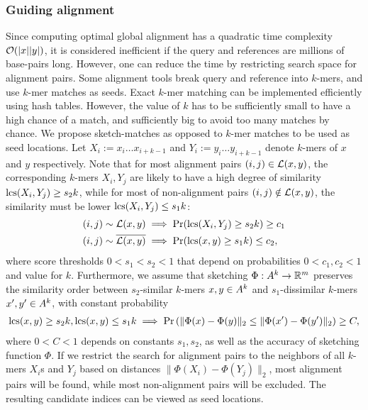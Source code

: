 \subsubsection*{Guiding alignment}
Since computing optimal global alignment has a quadratic time complexity $\mathcal{O}(|x||y|)$, it is considered inefficient if the query and references are millions of base-pairs long. However, one can reduce the time by restricting search space for alignment pairs. Some alignment tools break query and reference into $k$-mers, and use $k$-mer matches as seeds. Exact $k$-mer matching can be implemented efficiently using hash tables. However, the value of $k$ has to be sufficiently small to have a high chance of a match, and sufficiently big to avoid too many matches by chance. 
We propose sketch-matches as opposed to $k$-mer matches to be used as seed locations. Let $X_i:=x_i\dots x_{i+k-1}$ and $Y_i:=y_i\dots y_{i+k-1}$ denote $k$-mers of $x$ and $y$ respectively. Note that for most alignment pairs $(i,j)\in \mathcal{L}(x,y)$, the corresponding $k$-mers $X_i,Y_j$ are likely to have a high degree of similarity $\operatorname{\mathrm{lcs}}(X_i,Y_j)\ge s_2 k$, while for most of non-alignment pairs $(i,j)\notin \mathcal{L}(x,y)$, the similarity must be lower $\operatorname{\mathrm{lcs}}(X_i,Y_j)\le s_1 k$:
\begin{align}
 &(i,j)\sim \mathcal{L}(x,y) \implies \Pr(\operatorname{\mathrm{lcs}}(X_i,Y_j)\ge s_2 k) \ge c_1 \\
 &(i,j)\sim \overline{\mathcal{L}(x,y)} \implies \Pr(\operatorname{\mathrm{lcs}}(x,y)\ge s_1 k ) \le c_2,
\end{align}
where score thresholds $0< s_1 < s_2<1$ that depend on probabilities $0<c_1,c_2<1$ and value for $k$. 
Furthermore, we assume that sketching $\Phi: A^k\to\mathbb{R}^m$ preserves the similarity order between $s_2$-similar $k$-mers $x,y\in A^k$ and $s_1$-dissimilar $k$-mers $x',y'\in A^k$, with constant probability
\begin{align}
 \operatorname{\mathrm{lcs}}(x,y)\ge s_2 k,\operatorname{\mathrm{lcs}}(x,y)\le s_1 k \implies \Pr\left(\|\Phi(x)-\Phi(y)\|_2\le \|\Phi(x')-\Phi(y')\|_2\right)\ge C,
\end{align}
where $0<C<1$ depends on constants $s_1,s_2$, as well as the accuracy of sketching function $\Phi$.
If we restrict the search for alignment pairs to the neighbors of all $k$-mers $X_i$s and $Y_j$ based on distances $\|\Phi(X_i)-\Phi(Y_j)\|_2$, most alignment pairs will be found, while most non-alignment pairs will be excluded. The resulting candidate indices can be viewed as seed locations. 

